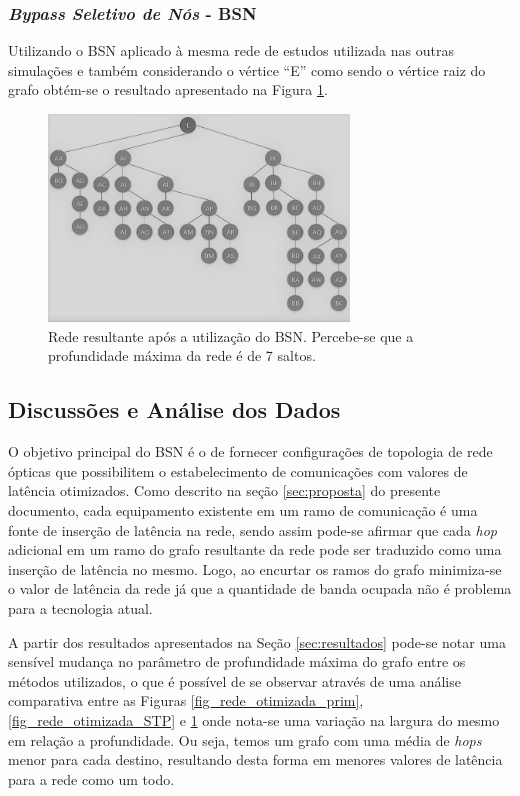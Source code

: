 \documentclass[12pt]{article}
\begin{document}
\subsubsection{\emph{Bypass Seletivo de Nós} - BSN}
Utilizando o BSN aplicado à mesma rede de estudos utilizada nas outras simulações e também considerando o vértice ``E'' como sendo o vértice raiz do grafo obtém-se o resultado apresentado na Figura \ref{fig_rede_otimizada_BSN}.

\begin{figure} %
	\centering
	\includegraphics[width=8cm]{Otimizada_BSN_PB}
	\caption{Rede resultante após a utilização do BSN. Percebe-se que a profundidade máxima da rede é de 7 saltos.}
	\label{fig_rede_otimizada_BSN}
\end{figure}



\subsection{Discussões e Análise dos Dados}

O objetivo principal do BSN é o de fornecer configurações de topologia de rede ópticas que possibilitem o estabelecimento de comunicações com valores de latência otimizados. Como descrito na seção \ref{sec:proposta} do presente documento, cada equipamento existente em um ramo de comunicação é uma fonte de inserção de latência na rede, sendo assim pode-se afirmar que cada \emph{hop} adicional em um ramo do grafo resultante da rede pode ser traduzido como uma inserção de latência no mesmo. Logo, ao encurtar os ramos do grafo minimiza-se o valor de latência da rede já que a quantidade de banda ocupada não é problema para a tecnologia atual.

A partir dos resultados apresentados na Seção \ref{sec:resultados} pode-se notar uma sensível mudança no parâmetro de profundidade máxima do grafo entre os métodos utilizados, o que é possível de se observar através de uma análise comparativa entre as Figuras \ref{fig_rede_otimizada_prim}, \ref{fig_rede_otimizada_STP} e \ref{fig_rede_otimizada_BSN} onde nota-se uma variação na largura do mesmo em relação a profundidade. Ou seja, temos um grafo com uma média de \emph{hops} menor para cada destino, resultando desta forma em menores valores de latência para a rede como um todo.
\end{document}
